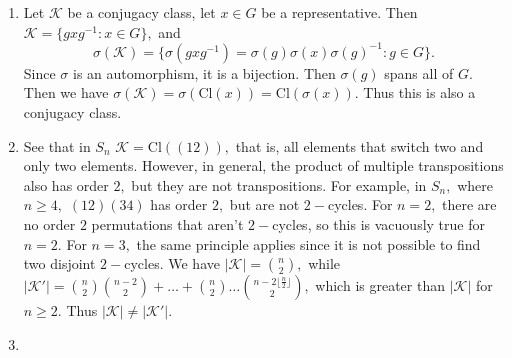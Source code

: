 \documentclass{article}
\title{} %
\author{Gandhar Kulkarni (mmat2304)} %
\date{} %
\begin{document}
\maketitle %


\section{} %
\begin{enumerate}
	\item Let $\mathcal{K}$ be a conjugacy class, let $x \in G$ be a representative. Then $\mathcal{K}=\{gxg^{-1}: x \in G  \},$ and $$\sigma(\mathcal{K})= 
	\{ \sigma(gxg^{-1})= \sigma(g) \sigma(x) \sigma(g)^{-1}: g \in G\}.$$ Since $\sigma$ is an automorphism, it is a bijection. Then $\sigma(g)$ spans all 
	of $G.$ Then we have $\sigma(\mathcal{K})=\sigma(\text{Cl}(x))= \text{Cl}(\sigma(x)).$ Thus this is also a conjugacy class.
	\item See that in $S_n$ $\mathcal{K}=\text{Cl}((12)),$ that is, all elements that switch two and only two elements. 
	However, in general, the product of multiple transpositions also has order $2,$ but they are not transpositions. For example, in $S_n,$ where $n \geq 
	4,$ $(1 2)(3 4)$ has order $2,$ but are not $2-$cycles. For $n=2,$ there are no order $2$ permutations that aren't $2-$cycles, so this is vacuously true 
	for $n=2.$ For $n=3,$ the same principle applies since it is not possible to find two disjoint $2-$cycles. We have $ |\mathcal{K}| = \binom{n}{2},$ 
	while $|\mathcal{K'}| = \binom{n}{2}\binom{n-2}{2} + \dots + \binom{n}{2} \dots \binom{n- 2 \lfloor\frac{n}{2}\rfloor}{2},$ which is greater than 
	$|\mathcal{K}|$ for $n \geq 2.$ Thus $|\mathcal{K}| \neq |\mathcal{K'}|.$ 
	\item  
\end{enumerate}
\end{document}
